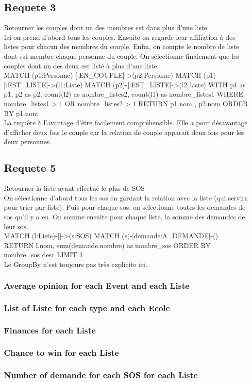\documentclass[a4paper,oneside,1pt]{article}
\begin{document}
\subsection{Requete 3}
Retourner les couples dont un des membres est dans plus d'une liste.
\\
Ici on prend d'abord tous les couples. Ensuite on regarde leur affiliation à des listes pour chacun des membres du couple. Enfin, on compte le nombre de liste dont est membre chaque personne du couple. On sélectionne finalement que les couples dont un des deux est listé à plus d'une liste.
\\
MATCH (p1:Personne)-[:EN\_COUPLE]->(p2:Personne)
MATCH (p1)-[:EST\_LISTE]->(l1:Liste)
MATCH (p2)-[:EST\_LISTE]->(l2:Liste)
WITH p1 as p1, p2 as p2, count(l2) as nombre\_listes2, count(l1) as nombre\_listes1
WHERE nombre\_listes1 > 1 OR nombre\_listes2 > 1 
RETURN p1.nom , p2.nom
ORDER BY p1.nom
\\
La requête à l'avantage d'être facilement compréhensible. Elle a pour désavantage d'afficher deux fois le couple car la relation de couple apparait deux fois pour les deux personnes.

\subsection{Requete 5}
Retourner la liste ayant effectué le plus de SOS
\\
On sélectionne d'abord tous les sos en gardant la relation avec la liste (qui servira pour trier par liste). Puis pour chaque sos, on sélectionne toutes les demandes de sos qu'il y a eu. On somme ensuite pour chaque liste, la somme des demandes de leur sos.
\\
MATCH (l:Liste)-[]->(s:SOS)
MATCH (s)-[demande:A\_DEMANDE]-()
RETURN l.nom, sum(demande.nombre) as nombre\_sos
ORDER BY nombre\_sos desc LIMIT 1
\\ 
Le GroupBy n'est toujours pas très explicite ici.

\subsubsection{Average opinion for each Event and each Liste} 

\subsubsection{List of Liste for each type and each Ecole}
\subsubsection{Finances for each Liste}
\subsubsection{Chance to win for each Liste}
\subsubsection{Number of demande for each SOS for each Liste}
\end{document}
